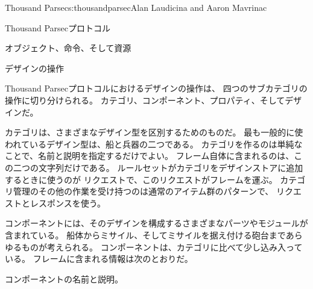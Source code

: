 \begin{aosachapter}{Thousand Parsec}{s:thousandparsec}{Alan Laudicina and Aaron Mavrinac}
\begin{aosasect1}{Thousand Parsecプロトコル}
\begin{aosasect2}{オブジェクト、命令、そして資源}
\end{aosasect2}

\begin{aosasect2}{デザインの操作}

Thousand Parsecプロトコルにおけるデザインの操作は、
四つのサブカテゴリの操作に切り分けられる。
カテゴリ、コンポーネント、プロパティ、そしてデザインだ。

カテゴリは、さまざまなデザイン型を区別するためのものだ。
最も一般的に使われているデザイン型は、船と兵器の二つである。
カテゴリを作るのは単純なことで、名前と説明を指定するだけでよい。
フレーム自体に含まれるのは、この二つの文字列だけである。
ルールセットがカテゴリをデザインストアに追加するときに使うのが
リクエストで、このリクエストがフレームを運ぶ。
カテゴリ管理のその他の作業を受け持つのは通常のアイテム群のパターンで、
リクエストとレスポンスを使う。

コンポーネントには、そのデザインを構成するさまざまなパーツやモジュールが含まれている。
船体からミサイル、そしてミサイルを据え付ける砲台まであらゆるものが考えられる。
コンポーネントは、カテゴリに比べて少し込み入っている。
フレームに含まれる情報は次のとおりだ。

\begin{aosaitemize}

  \item コンポーネントの名前と説明。


\end{aosaitemize}
\end{aosasect2}
\end{aosasect1}
\end{aosachapter}
